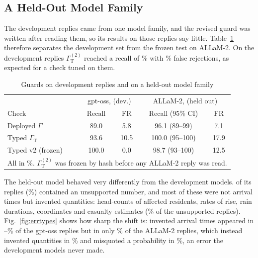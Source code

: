 \documentclass[conference]{IEEEtran}
\begin{document}
\subsection{A Held-Out Model Family}
\label{sec:heldout}
The development replies came from one model family, and the revised guard was written after reading them, so its results on those replies say little. Table~\ref{tab:heldout} therefore separates the development set from the frozen test on ALLaM-2. On the development replies $\Gamma_{\mathrm{T}}^{(2)}$ reached a recall of \DevVtwoRec\% with \DevVtwoFpr\% false rejections, as expected for a check tuned on them.

\begin{table}[t]
\caption{Guards on development replies and on a held-out model family}
\label{tab:heldout}
\centering
\footnotesize
\setlength{\tabcolsep}{2.6pt}
\begin{tabular}{lcccc}
\toprule
 & \multicolumn{2}{c}{gpt-oss, \LiveN{} (dev.)} & \multicolumn{2}{c}{ALLaM-2, \HoN{} (held out)}\\
Check & Recall & FR & Recall (95\% CI) & FR\\
\midrule
Deployed $\Gamma$ & 89.0 & 5.8 & 96.1 (89--99) & 7.1\\
Typed $\Gamma_{\mathrm{T}}$ & 93.6 & 10.5 & 100.0 (95--100) & 17.9\\
Typed v2 (frozen) & 100.0 & 0.0 & 98.7 (93--100) & 12.5\\
\bottomrule
\multicolumn{5}{l}{\scriptsize All in \%. $\Gamma_{\mathrm{T}}^{(2)}$ was frozen by hash before any ALLaM-2 reply was read.}\\
\end{tabular}
\end{table}

The held-out model behaved very differently from the development models. \HoUnsup{} of its \HoN{} replies (\HoUnsupPct\%) contained an unsupported number, and most of these were not arrival times but invented quantities: head-counts of affected residents, rates of rise, rain durations, coordinates and casualty estimates (\HoCountPct\% of the unsupported replies). Fig.~\ref{fig:errtypes} shows how sharp the shift is: invented arrival times appeared in \ErrOssEtaMin--\ErrOssEtaMax\% of the gpt-oss replies but in only \ErrAllamEta\% of the ALLaM-2 replies, which instead invented quantities in \ErrAllamQty\% and misquoted a probability in \ErrAllamProb\%, an error the development models never made.
\end{document}
